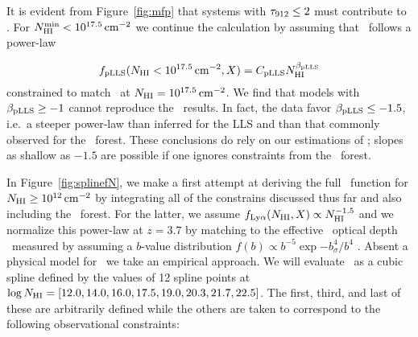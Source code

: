 \documentclass[12pt,preprint]{aastex}
\begin{document}
It is evident from Figure~\ref{fig:mfp} that systems with 
$\tau_{\rm 912} \le 2$ must contribute to \lmfp.
For $N_{\rm HI}^{\rm min} < 10^{17.5} \, {\rm cm^{-2}}$ we continue the calculation
by assuming that \fnhi\ follows a power-law


\begin{equation}
f_{\rm pLLS}(N_{\rm HI} < 10^{17.5} \, {\rm cm^{-2}}, X) = 
  C_{\rm pLLS} N_{\rm HI}^{\beta_{\rm pLLS}} 
\label{eqn:fplls}
\end{equation}
constrained to match \lfnhi\ at $N_{\rm HI} = 10^{17.5} \, {\rm cm^{-2}}$.
We find that models with $\beta_{\rm pLLS} \ge -1$ cannot reproduce
the \lmfp\ results.  In fact, the data favor $\beta_{\rm pLLS} \le -1.5$,
i.e.\ a steeper power-law than inferred for the LLS and than
that commonly observed for the \lya\ forest.  These conclusions
do rely on our
estimations of \llls; slopes as shallow as $-1.5$ are possible
if one ignores constraints from the \lya\ forest.


In Figure~\ref{fig:splinefN}, we make a first attempt at deriving
the full \fnhi\ function for $N_{\rm HI} \ge 10^{12} \, {\rm cm^{-2}}$ by integrating
all of the constrains discussed thus far and also including the
\lya\ forest.  
For the latter, we assume $f_{\rm Ly\alpha}(N_{\rm HI},X) \propto N_{\rm HI}^{-1.5}$
and we normalize this power-law at $z=3.7$ by matching to the
effective \lya\ optical depth \lteff\ measured by \cite{fpl+08}
assuming a $b$-value distribution
$f(b) \propto b^{-5} \exp{-b_\sigma^4/b^4}$ \citep{hr99}. 
Absent a physical model for \fnhi\ we take an empirical approach.
We will evaluate \fnhi\ as a cubic spline \citep{press92}
defined by the values of 12 spline points at 
$\log N_{\rm HI} = [12.0, 14.0, 16.0, 17.5, 19.0, 20.3, 21.7, 22.5]$.
The first, third, and last of these are arbitrarily defined
while the others are taken to correspond to the following
observational constraints:
\end{document}
